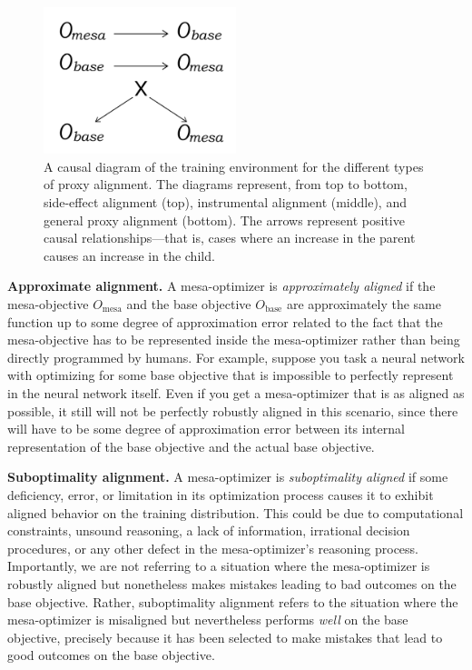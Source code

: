 \documentclass[
  onecolumn,
  natbib,
]{miri-tech-article}
\begin{document}
\begin{figure}[h!]
  \centering
  \includegraphics[width=0.5\textwidth]{3_1.jpg}
  \caption{A causal diagram of the training environment for the different types of proxy alignment. The diagrams represent, from top to bottom, side-effect alignment (top), instrumental alignment (middle), and general proxy alignment (bottom). The arrows represent positive causal relationships---that is, cases where an increase in the parent causes an increase in the child.}
  \label{fig:3.1}
\end{figure}

\textbf{Approximate alignment.} A mesa-optimizer is \textit{approximately aligned} if the mesa-objective $O_\text{mesa}$ and the base objective $O_\text{base}$ are approximately the same function up to some degree of approximation error related to the fact that the mesa-objective has to be represented inside the mesa-optimizer rather than being directly programmed by humans. For example, suppose you task a neural network with optimizing for some base objective that is impossible to perfectly represent in the neural network itself. Even if you get a mesa-optimizer that is as aligned as possible, it still will not be perfectly robustly aligned in this scenario, since there will have to be some degree of approximation error between its internal representation of the base objective and the actual base objective.

\textbf{Suboptimality alignment.} A mesa-optimizer is \textit{suboptimality aligned} if some deficiency, error, or limitation in its optimization process causes it to exhibit aligned behavior on the training distribution. This could be due to computational constraints, unsound reasoning, a lack of information, irrational decision procedures, or any other defect in the mesa-optimizer's reasoning process. Importantly, we are not referring to a situation where the mesa-optimizer is robustly aligned but nonetheless makes mistakes leading to bad outcomes on the base objective. Rather, suboptimality alignment refers to the situation where the mesa-optimizer is misaligned but nevertheless performs \textit{well} on the base objective, precisely because it has been selected to make mistakes that lead to good outcomes on the base objective.
\end{document}
